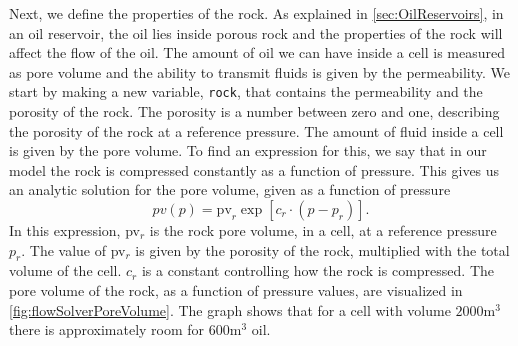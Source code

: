 Next, we define the properties of the rock. As explained in \autoref{sec:OilReservoirs}, in an oil reservoir, the oil lies inside porous rock and the properties of the rock will affect the flow of the oil. The amount of oil we can have inside a cell is measured as pore volume and the ability to transmit fluids is given by the permeability. We start by making a new variable, \texttt{rock}, that contains the permeability and the porosity of the rock. The porosity is a number between zero and one, describing the porosity of the rock at a reference pressure. The amount of fluid inside a cell is given by the pore volume. To find an expression for this, we say that in our model the rock is compressed constantly as a function of pressure. This gives us an analytic solution for the pore volume, given as a function of pressure
\begin{equation}
    pv(p) = \text{pv}_r \exp[c_r\cdot(p-p_r)].
    \label{eq:poreVolume}
\end{equation}
In this expression, pv$_r$ is the rock pore volume, in a cell, at a reference pressure $p_r$. The value of pv$_r$ is given by the porosity of the rock, multiplied with the total volume of the cell. $c_r$ is a constant controlling how the rock is compressed. The pore volume of the rock, as a function of pressure values, are visualized in \autoref{fig:flowSolverPoreVolume}. The graph shows that for a cell with volume $2000\text{m}^3$ there is approximately room for $600\text{m}^3$ oil.

